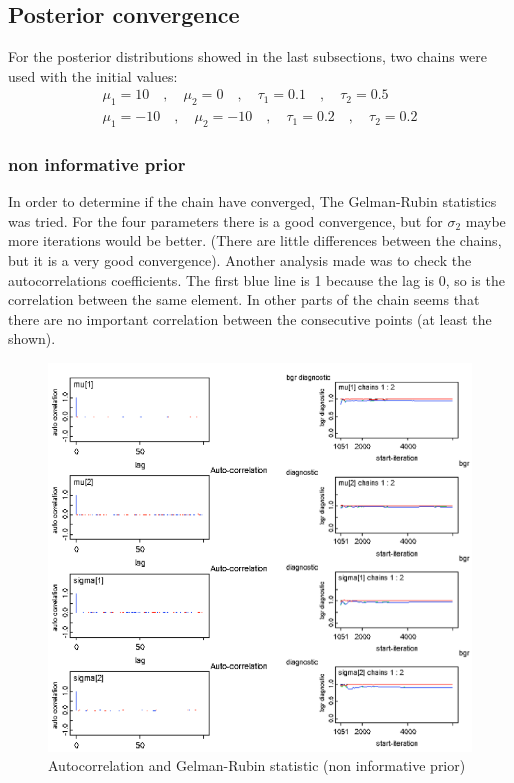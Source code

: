 \documentclass{article}
\begin{document}
\pagebreak

\subsection{Posterior convergence}

For the posterior distributions showed in the last subsections, two chains were used with the initial values:
\begin{equation}
\begin{split}
\mu_1=10 \quad,\quad \mu_2 = 0 \quad,\quad \tau_1 = 0.1 \quad,\quad \tau_2 = 0.5 \\
\mu_1=-10 \quad,\quad \mu_2 = -10 \quad,\quad \tau_1 = 0.2 \quad,\quad \tau_2 = 0.2
\end{split}
\end{equation}

\subsubsection{non informative prior}

In order to determine if the chain have converged, The Gelman-Rubin statistics was tried. For the four parameters there is a good convergence, but for $\sigma_2$ maybe more iterations would be better. (There are little differences between the chains, but it is a very good convergence). Another analysis made was to check the autocorrelations coefficients. The first blue line is 1 because the lag is 0, so is the correlation between the same element. In other parts of the chain seems that there are no important correlation between the consecutive points (at least the shown).

\begin{figure}[ht!]
  \centering
  \includegraphics[width=1\textwidth]{imgs/NonInf.png}
  \caption{Autocorrelation and Gelman-Rubin statistic (non informative prior)}
  \label{fig:fig5}
\end{figure}
\end{document}
